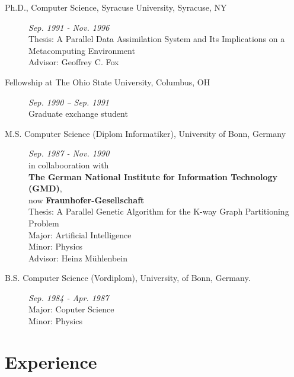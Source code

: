 \documentclass{article}
\begin{document}
\begin{description}
\item[Ph.D., Computer Science, Syracuse University, Syracuse, NY] \hfill {\it Sep. 1991 - Nov. 1996} ~\\
      Thesis: A Parallel Data Assimilation System and Its Implications   
      on a Metacomputing Environment\\
      Advisor: Geoffrey C. Fox 

\item[Fellowship at The Ohio State University,
  Columbus, OH] \hfill {\it Sep. 1990 – Sep. 1991}~\\
  Graduate exchange student

\item[M.S. Computer Science (Diplom Informatiker), University of Bonn, Germany] \hfill {\it Sep. 1987 - Nov. 1990}~\\
  in collabooration with \\
  {\bf The German National Institute for Information Technology (GMD)}, \\
  now {\bf Fraunhofer-Gesellschaft} ~\\
  Thesis: A Parallel Genetic Algorithm for the K-way Graph Partitioning Problem  \\
  Major: Artificial Intelligence \\
  Minor: Physics \\  
  Advisor: Heinz Mühlenbein 

\item[B.S. Computer Science (Vordiplom), University, of Bonn, Germany.] \hfill {\it Sep. 1984 - Apr. 1987} ~\\  
  Major: Coputer Science\\
  Minor: Physics \\  

\end{description}
 

\section{Experience}
\end{document}
